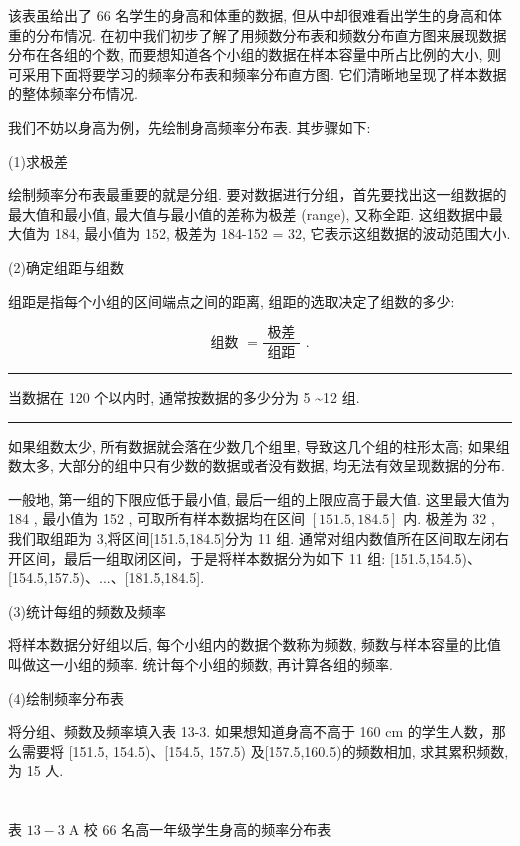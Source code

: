 \documentclass[10pt]{article}
\newcommand{\HRule}{\begin{center}\rule{0.9\linewidth}{0.2mm}\end{center}}
\begin{document}
该表虽给出了 66 名学生的身高和体重的数据, 但从中却很难看出学生的身高和体重的分布情况. 在初中我们初步了解了用频数分布表和频数分布直方图来展现数据分布在各组的个数, 而要想知道各个小组的数据在样本容量中所占比例的大小, 则可采用下面将要学习的频率分布表和频率分布直方图. 它们清晰地呈现了样本数据的整体频率分布情况.

我们不妨以身高为例，先绘制身高频率分布表. 其步骤如下:

(1)求极差

绘制频率分布表最重要的就是分组. 要对数据进行分组，首先要找出这一组数据的最大值和最小值, 最大值与最小值的差称为极差 (range), 又称全距. 这组数据中最大值为 184, 最小值为 152, 极差为 184-152 = 32, 它表示这组数据的波动范围大小.

(2)确定组距与组数

组距是指每个小组的区间端点之间的距离, 组距的选取决定了组数的多少:

\[
\text{ 组数 } = \frac{\text{ 极差 }}{\text{ 组距 }}\text{ . }
\]

\HRule

当数据在 120 个以内时, 通常按数据的多少分为 5 \textasciitilde  12 组.

\HRule

如果组数太少, 所有数据就会落在少数几个组里, 导致这几个组的柱形太高; 如果组数太多, 大部分的组中只有少数的数据或者没有数据, 均无法有效呈现数据的分布.

一般地, 第一组的下限应低于最小值, 最后一组的上限应高于最大值. 这里最大值为 184 , 最小值为 152 , 可取所有样本数据均在区间 \(\left\lbrack  {{151.5},{184.5}}\right\rbrack\) 内. 极差为 32 , 我们取组距为 3,将区间[151.5,184.5]分为 11 组. 通常对组内数值所在区间取左闭右开区间，最后一组取闭区间，于是将样本数据分为如下 11 组: [151.5,154.5)、[154.5,157.5)、...、[181.5,184.5].

(3)统计每组的频数及频率

将样本数据分好组以后, 每个小组内的数据个数称为频数, 频数与样本容量的比值叫做这一小组的频率. 统计每个小组的频数, 再计算各组的频率.

(4)绘制频率分布表

将分组、频数及频率填入表 13-3. 如果想知道身高不高于 160 cm 的学生人数，那么需要将 [151.5, 154.5)、[154.5, 157.5) 及[157.5,160.5)的频数相加, 求其累积频数, 为 15 人.

\section*{}



表 \({13} - 3\mathrm{\;A}\) 校 66 名高一年级学生身高的频率分布表
\end{document}
